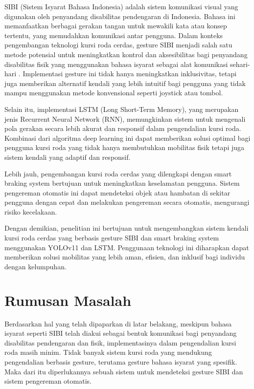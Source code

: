 SIBI (Sistem Isyarat Bahasa Indonesia) adalah sistem komunikasi visual yang digunakan oleh penyandang disabilitas pendengaran di Indonesia. Bahasa ini memanfaatkan berbagai gerakan tangan untuk mewakili kata atau konsep tertentu, yang memudahkan komunikasi antar pengguna\cite{Rani2019}. Dalam konteks pengembangan teknologi kursi roda cerdas, gesture SIBI menjadi salah satu metode potensial untuk meningkatkan kontrol dan aksesibilitas bagi penyandang disabilitas fisik yang menggunakan bahasa isyarat sebagai alat komunikasi sehari-hari . Implementasi gesture ini tidak hanya meningkatkan inklusivitas, tetapi juga memberikan alternatif kendali yang lebih intuitif bagi pengguna yang tidak mampu menggunakan metode konvensional seperti joystick atau tombol.

Selain itu, implementasi LSTM (Long Short-Term Memory), yang merupakan jenis Recurrent Neural Network (RNN), memungkinkan sistem untuk mengenali pola gerakan secara lebih akurat dan responsif dalam pengendalian kursi roda\cite{Graves2019}. Kombinasi dari algoritma deep learning ini dapat memberikan solusi optimal bagi pengguna kursi roda yang tidak hanya membutuhkan mobilitas fisik tetapi juga sistem kendali yang adaptif dan responsif.

Lebih jauh, pengembangan kursi roda cerdas yang dilengkapi dengan smart braking system bertujuan untuk meningkatkan keselamatan pengguna. Sistem pengereman otomatis ini dapat mendeteksi objek atau hambatan di sekitar pengguna dengan cepat dan melakukan pengereman secara otomatis, mengurangi risiko kecelakaan.

Dengan demikian, penelitian ini bertujuan untuk mengembangkan sistem kendali kursi roda cerdas yang berbasis gesture SIBI dan smart braking system menggunakan YOLOv11 dan LSTM. Penggunaan teknologi ini diharapkan dapat memberikan solusi mobilitas yang lebih aman, efisien, dan inklusif bagi individu dengan kelumpuhan.
\section{Rumusan Masalah}
Berdasarkan hal yang telah dipaparkan di latar belakang, meskipun bahasa isyarat seperti SIBI telah diakui sebagai bentuk komunikasi bagi penyandang disabilitas pendengaran dan fisik, implementasinya dalam pengendalian kursi roda masih minim. Tidak banyak sistem kursi roda yang mendukung pengendalian berbasis gesture, terutama gesture bahasa isyarat yang spesifik. Maka dari itu diperlukannya sebuah sistem untuk mendeteksi gesture SIBI dan sistem pengereman otomatis.
